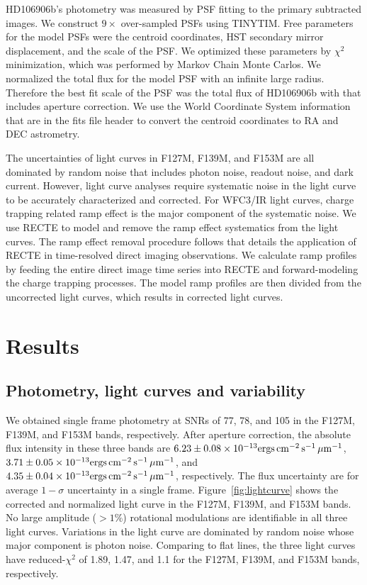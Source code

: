 \documentclass[modern]{aastex62}
\begin{document}
HD106906b's photometry was measured by PSF fitting to the primary subtracted images. We construct $9\times$ over-sampled PSFs using TINYTIM. Free parameters for the model PSFs were the centroid coordinates, HST secondary mirror displacement, and the scale of the PSF. We optimized these parameters by $\chi^{2}$ minimization, which was performed by Markov Chain Monte Carlos. We normalized the total flux for the model PSF with an infinite large radius. Therefore the best fit scale of the PSF was the total flux  of HD106906b with that includes aperture correction. We use the World Coordinate System information that are in the fits file header to convert the centroid coordinates to RA and DEC astrometry.

The uncertainties of light curves in F127M, F139M, and F153M are all dominated by random noise that includes photon noise, readout noise, and dark current. However, light curve analyses require systematic noise in the light curve to be accurately characterized and corrected. For WFC3/IR light curves, charge trapping related ramp effect is the major component of the systematic noise. We use RECTE \citep{Zhou2017} to model and remove the ramp effect systematics from the light curves. The ramp effect removal procedure follows \citet{Zhou2019} that details the application of RECTE in time-resolved direct imaging observations. We calculate ramp profiles by feeding the entire direct image time series into RECTE and forward-modeling the charge trapping processes. The model ramp profiles are then divided from the uncorrected light curves, which results in corrected light curves. 

\section{Results}
\subsection{Photometry, light curves and variability}

\newcommand{\fluxunit}{\ensuremath{\mathrm{ergs}\,\mathrm{cm^{-2}}\,\mathrm{s^{-1}}\,\mathrm{\micron^{{-1}}}}}
We obtained single frame photometry at SNRs of 77, 78, and 105 in the F127M, F139M, and F153M bands, respectively. After aperture correction, the absolute flux intensity in these three bands are $6.23\pm0.08\times10^{-13}\fluxunit$, $3.71\pm0.05\times10^{-13}\fluxunit$, and $4.35\pm0.04\times10^{{-13}}\fluxunit$, respectively. The flux uncertainty are for average $1-\sigma$ uncertainty in a single frame. Figure~\ref{fig:lightcurve} shows the corrected and normalized light curve in the F127M, F139M, and F153M bands.  No large amplitude ($>1\%$) rotational modulations are identifiable in all three light curves. Variations in the light curve are dominated by random noise whose major component is photon noise. Comparing to flat lines, the three light curves have reduced-$\chi^{2}$ of 1.89, 1.47, and 1.1 for the F127M, F139M, and F153M bands, respectively.
\end{document}
